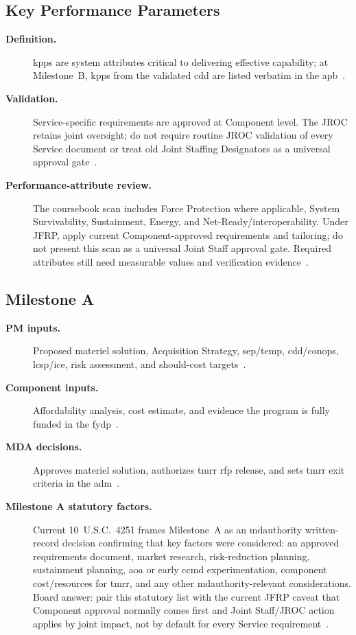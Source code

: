\documentclass[../main.tex]{subfiles}
\begin{document}
\subsection{Key Performance Parameters}
\begin{description}
  \item[\textbf{Definition.}] \acp{kpp} are system attributes critical to delivering effective capability; at Milestone~B, \acp{kpp} from the validated \ac{cdd} are listed verbatim in the \ac{apb}~\autocite{DoDI5000-85,edo-3-3-2-acq-milestones-phases-2025}.
  \item[\textbf{Validation.}] Service-specific requirements are approved at Component level. The JROC retains joint oversight; do not require routine JROC validation of every Service document or treat old Joint Staffing Designators as a universal approval gate~\autocite{edo-3-3-3-jfrp-2026,edo-3-3-2-acq-milestones-phases-2025}.
  \item[\textbf{Performance-attribute review.}] The coursebook scan includes Force Protection where applicable, System Survivability, Sustainment, Energy, and Net-Ready/interoperability. Under JFRP, apply current Component-approved requirements and tailoring; do not present this scan as a universal Joint Staff approval gate. Required attributes still need measurable values and verification evidence~\autocite{edo-3-3-3-jfrp-2026,DAU-Performance-Attributes,edo-3-3-2-acq-milestones-phases-2025}.
\end{description}

\subsection{Milestone A}
\begin{description}
  \item[\textbf{PM inputs.}] Proposed materiel solution, Acquisition Strategy, \ac{sep}/\ac{temp}, \ac{cdd}/\ac{conops}, \ac{lcsp}/\ac{ice}, risk assessment, and should-cost targets~\autocite{edo-3-3-2-acq-milestones-phases-2025}.
  \item[\textbf{Component inputs.}] Affordability analysis, cost estimate, and evidence the program is fully funded in the \ac{fydp}~\autocite{edo-3-3-2-acq-milestones-phases-2025}.
  \item[\textbf{MDA decisions.}] Approves materiel solution, authorizes \ac{tmrr} \ac{rfp} release, and sets \ac{tmrr} exit criteria in the \ac{adm}~\autocite{edo-3-3-2-acq-milestones-phases-2025}.
  \item[\textbf{Milestone A statutory factors.}] Current 10~U.S.C.\ 4251 frames Milestone~A as an \ac{mdauthority} written-record decision confirming that key factors were considered: an approved requirements document, market research, risk-reduction planning, sustainment planning, \ac{aoa} or early \ac{ccmd} experimentation, component cost/resources for \ac{tmrr}, and any other \ac{mdauthority}-relevant considerations. Board answer: pair this statutory list with the current JFRP caveat that Component approval normally comes first and Joint Staff/JROC action applies by joint impact, not by default for every Service requirement~\autocite{USC-10-4251,CJCSM5123-01,edo-3-3-2-acq-milestones-phases-2025}.
\end{description}
\end{document}
